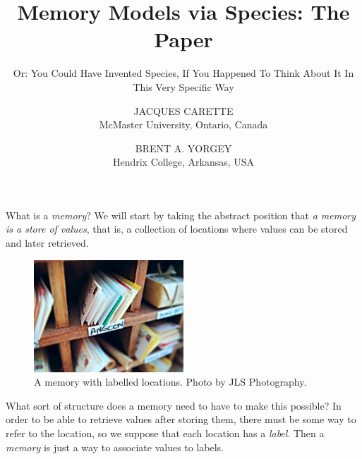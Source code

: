 \documentclass{jfp1}
\title{Memory Models via Species: The Paper}
\subtitle{Or: You Could Have Invented Species, If You Happened To Think
  About It In This Very Specific Way}
\author[J. Carette and B. A. Yorgey]{JACQUES CARETTE\\
  McMaster University, Ontario, Canada \\
  \email{carette@mcmaster.ca}
  \and BRENT A. YORGEY\\
  Hendrix College, Arkansas, USA\\
  \email{yorgey@hendrix.edu}}
\newcommand{\term}[1]{\emph{#1}}
\begin{document}
\maketitle

What is a \term{memory}?  We will start by taking the abstract
position that \emph{a memory is a store of values}, that is, 
a collection of locations where values can be stored and later retrieved.

\begin{figure}[htp]
  \centering
  \includegraphics[width=0.5\textwidth]{mailboxes.jpg}
  \caption{A memory with labelled locations. Photo by JLS Photography.\protect\footnotemark}
  \label{fig:mailboxes}
\end{figure}

What sort of structure does a memory need to have to make this
possible?  In order to be able to retrieve values after storing them,
there must be some way to refer to the location, so we
suppose that each location has a \emph{label}.  Then a \term{memory}
is just a way to associate values to labels.
\end{document}
